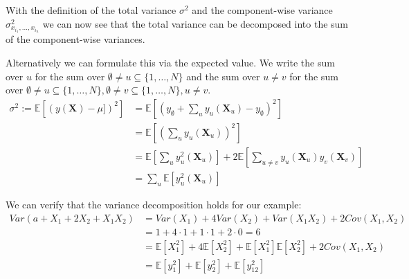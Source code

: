 With the definition of the total variance $\sigma^2$ and the component-wise variance $\sigma^2_{x_{i_1}, \dots, x_{i_n}}$ we can now see that the total variance can be decomposed into the sum of the component-wise variances.

Alternatively we can formulate this via the expected value. We write the sum over $u$ for the sum over $\emptyset \neq u \subseteq \{1, \dots, N\}$ and the sum over $u \neq v$ for the sum over $\emptyset \neq u \subseteq \{1, \dots, N\}, \emptyset \neq v \subseteq \{1, \dots, N\}, u \neq v$.
\begin{align*}
    \sigma^2 := \mathbb{E}[(y(\boldsymbol{X}) - \mu])^2]
    &= \mathbb{E}[(y_{\emptyset} + \sum_{u} y_u({\boldsymbol{X}_u}) - y_{\emptyset})^2] \\
    &= \mathbb{E}[(\sum_{u} y_u({\boldsymbol{X}_u}))^2] \\
    &= \mathbb{E}[\sum_{u} y_u^2({\boldsymbol{X}_u})] + 2 \mathbb{E}[\sum_{u \neq v} y_u({\boldsymbol{X}_u})  y_v({\boldsymbol{X}_v})] \\
    & = \sum_{u} \mathbb{E}[y_u^2({\boldsymbol{X}_u})]
\end{align*}

We can verify that the variance decomposition holds for our example:
\begin{align*}
    Var(a + X_1 + 2X_2 + X_1 X_2) &= Var(X_1) + 4Var(X_2) + Var(X_1X_2) + 2Cov(X_1, X_2) \\
    &= 1 + 4 \cdot 1 + 1 \cdot 1 + 2 \cdot 0 = 6 \\
    &= \mathbb{E}[X_1^2] + 4\mathbb{E}[X_2^2] + \mathbb{E}[X_1^2]\mathbb{E}[X_2^2] + 2Cov(X_1, X_2) \\
    &= \mathbb{E}[y_1^2] + \mathbb{E}[y_2^2] + \mathbb{E}[y_{12}^2] \\
\end{align*}










